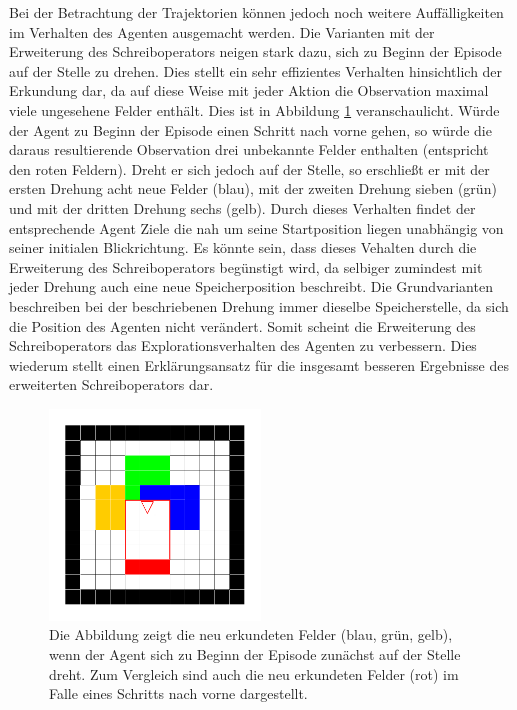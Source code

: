 Bei der Betrachtung der Trajektorien können jedoch noch weitere Auffälligkeiten im Verhalten des Agenten ausgemacht werden. Die Varianten mit der Erweiterung des Schreiboperators neigen stark dazu, sich zu Beginn der Episode auf der Stelle zu drehen. Dies stellt ein sehr effizientes Verhalten hinsichtlich der Erkundung dar, da auf diese Weise mit jeder Aktion die Observation maximal viele ungesehene Felder enthält. Dies ist in Abbildung \ref{sample_init_turn} veranschaulicht. Würde der Agent zu Beginn der Episode einen Schritt nach vorne gehen, so würde die daraus resultierende Observation drei unbekannte Felder enthalten (entspricht den roten Feldern). Dreht er sich jedoch auf der Stelle, so erschließt er mit der ersten Drehung acht neue Felder (blau), mit der zweiten Drehung sieben (grün) und mit der dritten Drehung sechs (gelb). Durch dieses Verhalten findet der entsprechende Agent Ziele die nah um seine Startposition liegen unabhängig von seiner initialen Blickrichtung. Es könnte sein, dass dieses Vehalten durch die Erweiterung des Schreiboperators begünstigt wird, da selbiger zumindest mit jeder Drehung auch eine neue Speicherposition beschreibt. Die Grundvarianten beschreiben bei der beschriebenen Drehung immer dieselbe Speicherstelle, da sich die Position des Agenten nicht verändert. Somit scheint die Erweiterung des Schreiboperators das Explorationsverhalten des Agenten zu verbessern. Dies wiederum stellt einen Erklärungsansatz für die insgesamt besseren Ergebnisse des erweiterten Schreiboperators dar.

\begin{figure}[ht!]
	\centering
	\includegraphics[keepaspectratio,width=0.5\textwidth]{abbildungen/sample_init_turn.pdf}
	\caption{Die Abbildung zeigt die neu erkundeten Felder (blau, grün, gelb), wenn der Agent sich zu Beginn der Episode zunächst auf der Stelle dreht. Zum Vergleich sind auch die neu erkundeten Felder (rot) im Falle eines Schritts nach vorne dargestellt.}
	\label{sample_init_turn}
\end{figure}

